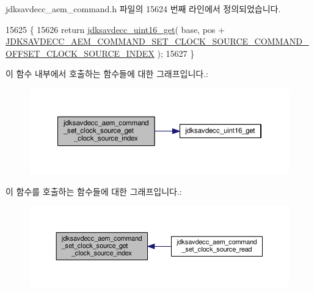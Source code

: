 jdksavdecc\+\_\+aem\+\_\+command.\+h 파일의 15624 번째 라인에서 정의되었습니다.


\begin{DoxyCode}
15625 \{
15626     \textcolor{keywordflow}{return} \hyperlink{group__endian_ga3fbbbc20be954aa61e039872965b0dc9}{jdksavdecc\_uint16\_get}( base, pos + 
      \hyperlink{group__command__set__clock__source_ga13e43f68e3de6cf18534c5e0c8c54054}{JDKSAVDECC\_AEM\_COMMAND\_SET\_CLOCK\_SOURCE\_COMMAND\_OFFSET\_CLOCK\_SOURCE\_INDEX}
       );
15627 \}
\end{DoxyCode}


이 함수 내부에서 호출하는 함수들에 대한 그래프입니다.\+:
\nopagebreak
\begin{figure}[H]
\begin{center}
\leavevmode
\includegraphics[width=350pt]{group__command__set__clock__source_gad9ec123022131523546ca958ae0e7f70_cgraph}
\end{center}
\end{figure}




이 함수를 호출하는 함수들에 대한 그래프입니다.\+:
\nopagebreak
\begin{figure}[H]
\begin{center}
\leavevmode
\includegraphics[width=350pt]{group__command__set__clock__source_gad9ec123022131523546ca958ae0e7f70_icgraph}
\end{center}
\end{figure}


